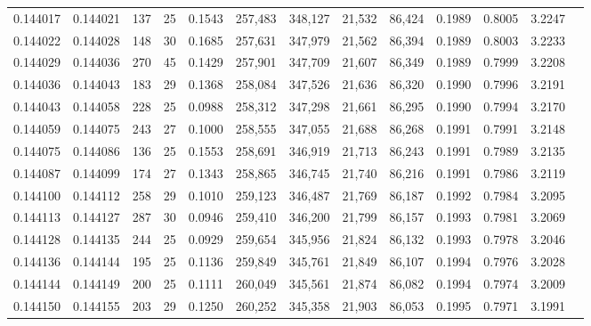\begin{tabular}{rrrrrrrrrrrrr}
0.144017 & 0.144021 & 137 &  25 &                                     0.1543 & 257,483 & 348,127 &  21,532 &  86,424 & 0.1989 & 0.8005 & 3.2247 \\
0.144022 & 0.144028 & 148 &  30 &                                     0.1685 & 257,631 & 347,979 &  21,562 &  86,394 & 0.1989 & 0.8003 & 3.2233 \\
0.144029 & 0.144036 & 270 &  45 &                                     0.1429 & 257,901 & 347,709 &  21,607 &  86,349 & 0.1989 & 0.7999 & 3.2208 \\
0.144036 & 0.144043 & 183 &  29 &                                     0.1368 & 258,084 & 347,526 &  21,636 &  86,320 & 0.1990 & 0.7996 & 3.2191 \\
0.144043 & 0.144058 & 228 &  25 &                                     0.0988 & 258,312 & 347,298 &  21,661 &  86,295 & 0.1990 & 0.7994 & 3.2170 \\
0.144059 & 0.144075 & 243 &  27 &                                     0.1000 & 258,555 & 347,055 &  21,688 &  86,268 & 0.1991 & 0.7991 & 3.2148 \\
0.144075 & 0.144086 & 136 &  25 &                                     0.1553 & 258,691 & 346,919 &  21,713 &  86,243 & 0.1991 & 0.7989 & 3.2135 \\
0.144087 & 0.144099 & 174 &  27 &                                     0.1343 & 258,865 & 346,745 &  21,740 &  86,216 & 0.1991 & 0.7986 & 3.2119 \\
0.144100 & 0.144112 & 258 &  29 &                                     0.1010 & 259,123 & 346,487 &  21,769 &  86,187 & 0.1992 & 0.7984 & 3.2095 \\
0.144113 & 0.144127 & 287 &  30 &                                     0.0946 & 259,410 & 346,200 &  21,799 &  86,157 & 0.1993 & 0.7981 & 3.2069 \\
0.144128 & 0.144135 & 244 &  25 &                                     0.0929 & 259,654 & 345,956 &  21,824 &  86,132 & 0.1993 & 0.7978 & 3.2046 \\
0.144136 & 0.144144 & 195 &  25 &                                     0.1136 & 259,849 & 345,761 &  21,849 &  86,107 & 0.1994 & 0.7976 & 3.2028 \\
0.144144 & 0.144149 & 200 &  25 &                                     0.1111 & 260,049 & 345,561 &  21,874 &  86,082 & 0.1994 & 0.7974 & 3.2009 \\
0.144150 & 0.144155 & 203 &  29 &                                     0.1250 & 260,252 & 345,358 &  21,903 &  86,053 & 0.1995 & 0.7971 & 3.1991 \\

\end{tabular}
